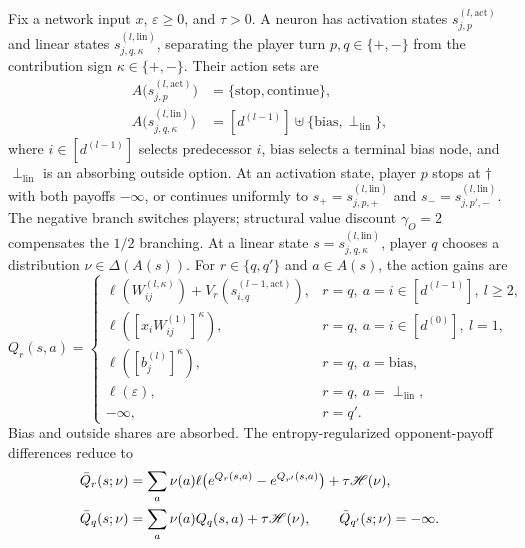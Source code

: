 \begin{definition}\label{ptnb:def:routing-recursion}
Fix a network input $x$, $\varepsilon\geq0$, and $\tau>0$. A neuron has activation states $s_{j,p}^{(l,\mathrm{act})}$ and linear states $s_{j,q,\kappa}^{(l,\mathrm{lin})}$, separating the player turn $p,q\in\{+,-\}$ from the contribution sign $\kappa\in\{+,-\}$. Their action sets are
\[
\begin{aligned}
 A\bigl(s_{j,p}^{(l,\mathrm{act})}\bigr)&=\{\mathrm{stop},\mathrm{continue}\},\\
 A\bigl(s_{j,q,\kappa}^{(l,\mathrm{lin})}\bigr)&=[d^{(l-1)}]\uplus\{\mathrm{bias},\perp_{\mathrm{lin}}\},
\end{aligned}
\]
where $i\in[d^{(l-1)}]$ selects predecessor $i$, $\mathrm{bias}$ selects a terminal bias node, and $\perp_{\mathrm{lin}}$ is an absorbing outside option.
At an activation state, player $p$ stops at $\dagger$ with both payoffs $-\infty$, or continues uniformly to $s_+=s_{j,p,+}^{(l,\mathrm{lin})}$ and $s_-=s_{j,p',-}^{(l,\mathrm{lin})}$. The negative branch switches players; structural value discount $\gamma_O=2$ compensates the $1/2$ branching.
At a linear state $s=s_{j,q,\kappa}^{(l,\mathrm{lin})}$, player $q$ chooses a distribution $\nu\in\Delta(A(s))$. For $r\in\{q,q'\}$ and $a\in A(s)$, the action gains are
\begin{equation}\label{ptnb:eq:routing-linear-action}
 Q_r(s,a)=\begin{cases}
 \ell(W_{ij}^{(l,\kappa)})+V_r(s_{i,q}^{(l-1,\mathrm{act})}),&r=q,\ a=i\in[d^{(l-1)}],\ l\geq2,\\
 \ell([x_iW_{ij}^{(1)}]^\kappa),&r=q,\ a=i\in[d^{(0)}],\ l=1,\\
 \ell([b_j^{(l)}]^\kappa),&r=q,\ a=\mathrm{bias},\\
 \ell(\varepsilon),&r=q,\ a=\perp_{\mathrm{lin}},\\
 -\infty,&r=q'.
 \end{cases}
\end{equation}
Bias and outside shares are absorbed. The entropy-regularized opponent-payoff differences reduce to
\begin{align}\label{ptnb:eq:optimal-linear}
 \bar Q_r(s;\nu)&=\sum_a\nu(a)\ell\bigl(e^{Q_r(s,a)}-e^{Q_{r'}(s,a)}\bigr)+\tau\mathscr{H}(\nu),\nonumber\\
 \bar Q_q(s;\nu)&=\sum_a\nu(a)Q_q(s,a)+\tau\mathscr{H}(\nu),\qquad \bar Q_{q'}(s;\nu)=-\infty.
\end{align}

\end{definition}
